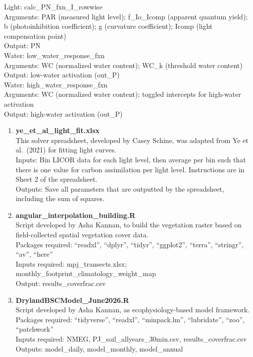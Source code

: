 \documentclass[
]{article}
\begin{document}
Light: calc\_PN\_fxn\_I\_rowwise\\
Arguments: PAR (measured light level); f\_Io\_Icomp (apparent quantum
yield); b (photoinhibition coefficient); g (curvature coefficient);
Icomp (light compensation point)\\
Output: PN\\

Water: low\_water\_response\_fxn\\
Arguments: WC (normalized water content); WC\_k (threshold water
content)\\
Output: low-water activation (out\_P)\\
Water: high\_water\_response\_fxn\\
Arguments: WC (normalized water content); toggled intercepts for
high-water activation\\
Output: high-water activation (out\_P)\\

\begin{enumerate}
\def\labelenumi{\arabic{enumi}.}
\setcounter{enumi}{2}
\item
  \textbf{ye\_et\_al\_light\_fit.xlsx}\\
  This solver spreadsheet, developed by Casey Schine, was adapted from
  Ye et al.~(2021) for fitting light curves.\\
  Inputs: Bin LICOR data for each light level, then average per bin such
  that there is one value for carbon assimilation per light level.
  Instructions are in Sheet 2 of the spreadsheet.\\
  Outputs: Save all parameters that are outputted by the spreadsheet,
  including the sum of squares.\\
\item
  \textbf{angular\_interpolation\_building.R}\\
  Script developed by Asha Kannan, to build the vegetation raster based
  on field-collected spatial vegetation cover data.\\
  Packages required: ``readxl'', ``dplyr'', ``tidyr'', ``ggplot2'',
  ``terra'', ``stringr'', ``av'', ``here''\\
  Inputs required: mpj\_transects.xlsx;
  monthly\_footprint\_climatology\_weight\_map\\
  Output: results\_coverfrac.csv\\
\item
  \textbf{DrylandBSCModel\_June2026.R}\\
  Script developed by Asha Kannan, as ecophysiology-based model
  framework.\\
  Packages required: ``tidyverse'', ``readxl'', ``minpack.lm'',
  ``lubridate'', ``zoo'', ``patchwork''\\
  Inputs required: NMEG, PJ\_soil\_allyears\_30min.csv,
  results\_coverfrac.csv\\
  Outputs: model\_daily, model\_monthly, model\_annual\\
\end{enumerate}
\end{document}
